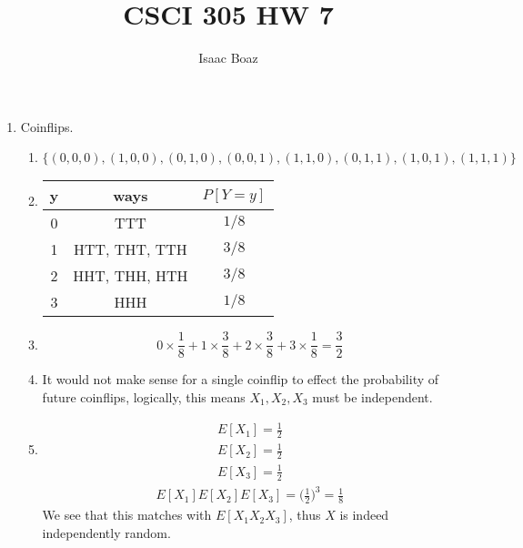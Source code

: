 \documentclass{article}
\title{CSCI 305 HW 7}
\author{Isaac Boaz}
\begin{document}
\maketitle

\begin{enumerate}
      \item Coinflips.
            \begin{enumerate}[label=\alph*.]
                  \item \begin{equation*}
                              \bigl\{(0, 0, 0), (1, 0, 0), (0, 1, 0), (0, 0, 1),
                              (1, 1, 0), (0, 1, 1), (1, 0, 1), (1, 1, 1)\bigr\}
                        \end{equation*}
                  \item \begin{tabular}{c|c|c}
                              y & ways          & \(P[Y=y]\) \\
                              \hline
                              0 & TTT           & $1/8$      \\
                              1 & HTT, THT, TTH & $3/8$      \\
                              2 & HHT, THH, HTH & $3/8$      \\
                              3 & HHH           & $1/8$
                        \end{tabular}
                  \item \begin{equation*}
                              0 \times \frac{1}{8} + 1 \times \frac{3}{8} + 2 \times \frac{3}{8} + 3 \times \frac{1}{8} = \frac{3}{2}
                        \end{equation*}
                  \item It would not make sense for a single coinflip to effect the probability of future coinflips, logically, this means \(X_1, X_2, X_3\) must be independent.
                  \item \begin{align*}
                              E[X_1] = \frac{1}{2} \\
                              E[X_2] = \frac{1}{2} \\
                              E[X_3] = \frac{1}{2}
                        \end{align*}
                        \begin{align*}
                              E[X_1]E[X_2]E[X_3] = \bigl(\frac{1}{2}\bigr)^3 = \frac{1}{8}
                        \end{align*}
                        We see that this matches with \(E[X_1X_2X_3]\), thus \(X\) is indeed independently random.
            \end{enumerate}
\end{enumerate}
\end{document}
